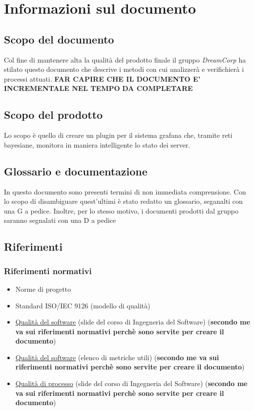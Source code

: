 \section{Informazioni sul documento}
\subsection{Scopo del documento}
 Col fine di mantenere alta la qualità del prodotto finale il gruppo \textit{DreamCorp} ha stilato questo documento che descrive i metodi con cui analizzerà e verifichierà i processi attuati. \textbf{FAR CAPIRE CHE IL DOCUMENTO E' INCREMENTALE NEL TEMPO}
 \textbf{DA COMPLETARE}
 \subsection{Scopo del prodotto}
 Lo scopo è quello di creare un plugin per il sistema grafana che, tramite reti bayesiane, monitora in maniera intelligente lo stato dei server.
 \subsection{Glossario e documentazione}
 In questo documento sono presenti termini di non immediata comprensione. Con lo scopo di disambiguare quest'ultimi è stato redatto un glossario, seganalti con una G a pedice.
 Inoltre, per lo stesso motivo, i documenti prodotti dal gruppo saranno segnalati con una D a pedice
 \newpage
 \subsection{Riferimenti}
 \subsubsection{Riferimenti normativi}
 \begin{itemize}
 	\item Norme di progetto
 	\item Standard ISO/IEC 9126 (modello di qualità)
	\item  \href{https://}{Qualità del software} (slide del corso di Ingegneria del Software) (\textbf{secondo me va sui riferimenti normativi perchè sono servite per creare il documento})
	\item  \href{https://it.wikipedia.org/wiki/Qualità_del_software}{Qualità del software} (elenco di metriche utili) (\textbf{secondo me va sui riferimenti normativi perchè sono servite per creare il documento})
 	\item  \href{https://}{Qualità di processo} (slide del corso di Ingegneria del Software) (\textbf{secondo me va sui riferimenti normativi perchè sono servite per creare il documento})
 \end{itemize}
